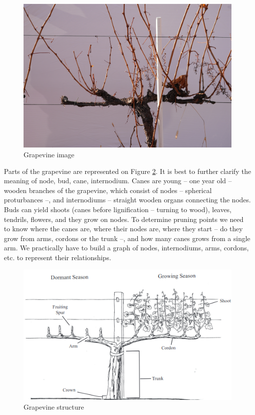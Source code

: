 \documentclass{PSAIE}%
\begin{document}
\begin{figure}[h]
      \centering
      \includegraphics[scale=0.08]{images/grapevine_image.jpg}
      \caption{Grapevine image}
      \label{fig_grapevine_image}
\end{figure}

Parts of the grapevine are represented on Figure \ref{fig_grapevine_structure}. It is best to further clarify
the meaning of node, bud, cane, internodium. Canes are young -- one year old -- wooden branches of the
grapevine, which consist of nodes -- spherical proturbances --, and internodiums -- straight wooden organs
connecting the nodes. Buds can yield shoots (canes before lignification -- turning to wood), leaves, tendrils,
flowers, and they grow on nodes. To determine pruning points we need to know where the canes are, where their
nodes are, where they start -- do they grow from arms, cordons or the trunk --, and how many canes grows from
a single arm. We practically have to build a graph of nodes, internodiums, arms, cordons, etc. to represent
their relationships.

\begin{figure}[h]
      \centering
      \includegraphics[scale=0.7]{images/grapevine_structure.png}
      \caption{Grapevine structure \cite{hellman2003grapevine}}
      \label{fig_grapevine_structure}
\end{figure}
\end{document}
